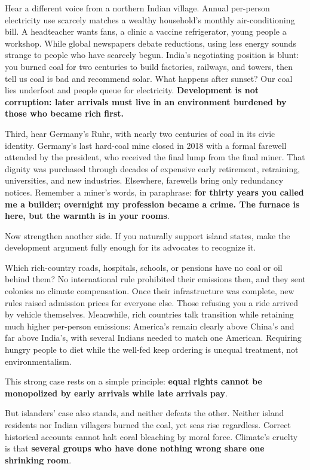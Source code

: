 Hear a different voice from a northern Indian village. Annual per-person electricity use scarcely matches a wealthy household's monthly air-conditioning bill. A headteacher wants fans, a clinic a vaccine refrigerator, young people a workshop. While global newspapers debate reductions, using less energy sounds strange to people who have scarcely begun. India's negotiating position is blunt: you burned coal for two centuries to build factories, railways, and towers, then tell us coal is bad and recommend solar. What happens after sunset? Our coal lies underfoot and people queue for electricity. \textbf{Development is not corruption: later arrivals must live in an environment burdened by those who became rich first.}

Third, hear Germany's Ruhr, with nearly two centuries of coal in its civic identity. Germany's last hard-coal mine closed in 2018 with a formal farewell attended by the president, who received the final lump from the final miner. That dignity was purchased through decades of expensive early retirement, retraining, universities, and new industries. Elsewhere, farewells bring only redundancy notices. Remember a miner's words, in paraphrase: \textbf{for thirty years you called me a builder; overnight my profession became a crime. The furnace is here, but the warmth is in your rooms}.

Now strengthen another side. If you naturally support island states, make the development argument fully enough for its advocates to recognize it.

Which rich-country roads, hospitals, schools, or pensions have no coal or oil behind them? No international rule prohibited their emissions then, and they sent colonies no climate compensation. Once their infrastructure was complete, new rules raised admission prices for everyone else. Those refusing you a ride arrived by vehicle themselves. Meanwhile, rich countries talk transition while retaining much higher per-person emissions: America's remain clearly above China's and far above India's, with several Indians needed to match one American. Requiring hungry people to diet while the well-fed keep ordering is unequal treatment, not environmentalism.

This strong case rests on a simple principle: \textbf{equal rights cannot be monopolized by early arrivals while late arrivals pay}.

But islanders' case also stands, and neither defeats the other. Neither island residents nor Indian villagers burned the coal, yet seas rise regardless. Correct historical accounts cannot halt coral bleaching by moral force. Climate's cruelty is that \textbf{several groups who have done nothing wrong share one shrinking room}.

